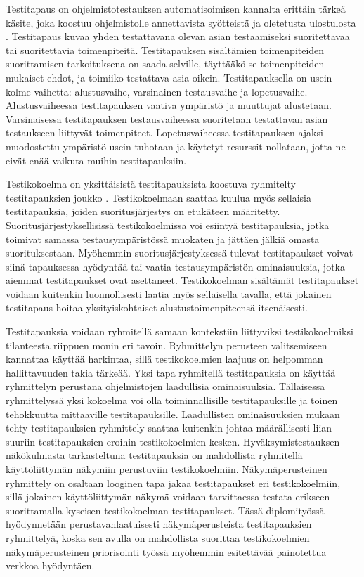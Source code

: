   Testitapaus on ohjelmistotestauksen automatisoimisen kannalta erittäin tärkeä käsite, joka koostuu ohjelmistolle annettavista syötteistä ja oletetusta ulostulosta \cite[s.~21]{software_testing_book}.
  Testitapaus kuvaa yhden testattavana olevan asian testaamiseksi suoritettavaa tai suoritettavia toimenpiteitä.
  Testitapauksen sisältämien toimenpiteiden suorittamisen tarkoituksena on saada selville, täyttääkö se toimenpiteiden mukaiset ehdot, ja toimiiko testattava asia oikein.
  Testitapauksella on usein kolme vaihetta: alustusvaihe, varsinainen testausvaihe ja lopetusvaihe.
  Alustusvaiheessa testitapauksen vaativa ympäristö ja muuttujat alustetaan.
  Varsinaisessa testitapauksen testausvaiheessa suoritetaan testattavan asian testaukseen liittyvät toimenpiteet.
  Lopetusvaiheessa testitapauksen ajaksi muodostettu ympäristö usein tuhotaan ja käytetyt resurssit nollataan, jotta ne eivät enää vaikuta muihin testitapauksiin.

  Testikokoelma on yksittäisistä testitapauksista koostuva ryhmitelty testitapauksien joukko \cite[s.~22]{software_testing_book}.
  Testikokoelmaan saattaa kuulua myös sellaisia testitapauksia, joiden suoritusjärjestys on etukäteen määritetty.
  Suoritusjärjestyksellisissä testikokoelmissa voi esiintyä testitapauksia, jotka toimivat samassa testausympäristössä muokaten ja jättäen jälkiä omasta suorituksestaan.
  Myöhemmin suoritusjärjestyksessä tulevat testitapaukset voivat siinä tapauksessa hyödyntää tai vaatia testausympäristön ominaisuuksia, jotka aiemmat testitapaukset ovat asettaneet.
  Testikokoelman sisältämät testitapaukset voidaan kuitenkin luonnollisesti laatia myös sellaisella tavalla, että jokainen testitapaus hoitaa yksityiskohtaiset alustustoimenpiteensä itsenäisesti.

  Testitapauksia voidaan ryhmitellä samaan kontekstiin liittyviksi testikokoelmiksi tilanteesta riippuen monin eri tavoin.
  Ryhmittelyn perusteen valitsemiseen kannattaa käyttää harkintaa, sillä testikokoelmien laajuus on helpomman hallittavuuden takia tärkeää.
  Yksi tapa ryhmitellä testitapauksia on käyttää ryhmittelyn perustana ohjelmistojen laadullisia ominaisuuksia.
  Tällaisessa ryhmittelyssä yksi kokoelma voi olla toiminnallisille testitapauksille ja toinen tehokkuutta mittaaville testitapauksille.
  Laadullisten ominaisuuksien mukaan tehty testitapauksien ryhmittely saattaa kuitenkin johtaa määrällisesti liian suuriin testitapauksien eroihin testikokoelmien kesken.
  Hyväksymistestauksen näkökulmasta tarkasteltuna testitapauksia on mahdollista ryhmitellä käyttöliittymän näkymiin perustuviin testikokoelmiin.
  Näkymäperusteinen ryhmittely on osaltaan looginen tapa jakaa testitapaukset eri testikokoelmiin, sillä jokainen käyttöliittymän näkymä voidaan tarvittaessa testata erikseen suorittamalla kyseisen testikokoelman testitapaukset.
  Tässä diplomityössä hyödynnetään perustavanlaatuisesti näkymäperusteista testitapauksien ryhmittelyä, koska sen avulla on mahdollista suorittaa testikokoelmien näkymäperusteinen priorisointi työssä myöhemmin esitettävää painotettua verkkoa hyödyntäen.

